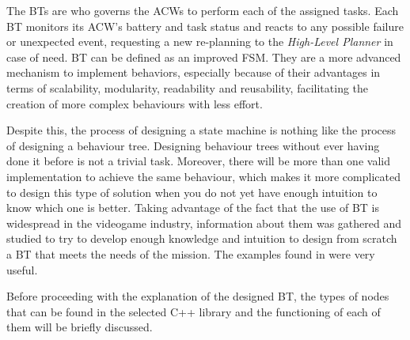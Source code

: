 The \glspl{BT} are who governs the \glspl{ACW} to perform each of the assigned tasks. Each \gls{BT} monitors its \gls{ACW}'s battery and task status and reacts to any possible failure or unexpected event, requesting a new re-planning to the \emph{High-Level Planner} in case of need. BT can be defined as an improved \gls{FSM}. They are a more advanced mechanism to implement behaviors, especially because of their advantages in terms of scalability, modularity, readability and reusability, facilitating the creation of more complex behaviours with less effort.

Despite this, the process of designing a state machine is nothing like the process of designing a behaviour tree. Designing behaviour trees without ever having done it before is not a trivial task. Moreover, there will be more than one valid implementation to achieve the same behaviour, which makes it more complicated to design this type of solution when you do not yet have enough intuition to know which one is better. Taking advantage of the fact that the use of \gls{BT} is widespread in the videogame industry, information about them was gathered and studied to try to develop enough knowledge and intuition to design from scratch a \gls{BT} that meets the needs of the mission. The examples found in \cite{BT-CPP-doc, colledanchise2018behavior, BT-AI} were very useful.

Before proceeding with the explanation of the designed BT, the types of nodes that can be found in the selected C++ library and the functioning of each of them will be briefly discussed.

